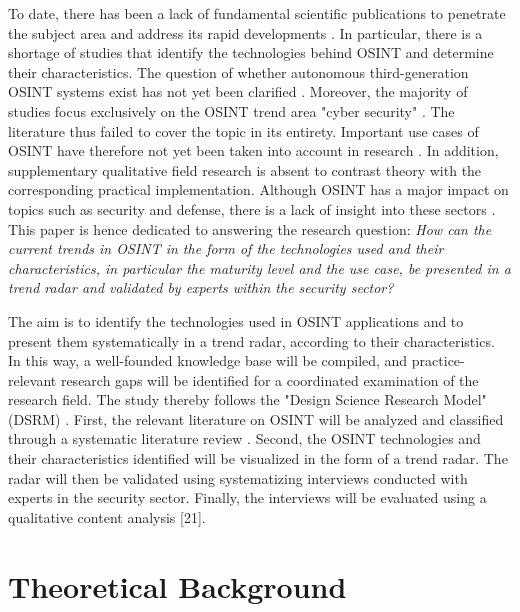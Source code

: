 \documentclass[10pt]{article}
\begin{document}
To date, there has been a lack of fundamental scientific publications to penetrate
the subject area \cite{HerreraCubides.2020} and address its rapid
developments \cite{Ghioni.2023, Williams.2018}. In particular, there is a shortage of
studies that identify the technologies behind OSINT and determine their characteristics.
The question of whether autonomous third-generation OSINT systems \cite{PastorGalindo.2019, PastorGalindo.2020} exist
has not yet been clarified \cite{Ghioni.2023, PastorGalindo.2020,Yogish.2021}.
Moreover, the majority of studies focus exclusively on the OSINT trend area "cyber
security" \cite{Hwang.2022, PastorGalindo.2019, Yogish.2021}. The literature thus failed to
cover the topic in its entirety. Important use cases of OSINT have
therefore not yet been taken into account in research \cite{AlKilani.2021, Dokman.2020, Ghioni.2023}.
In addition, supplementary qualitative field research is absent to contrast theory with
the corresponding practical implementation. Although OSINT has a major impact on topics
such as security and defense, there is a lack of insight into these sectors \cite{HerreraCubides.2020, PastorGalindo.2019}.
This paper is hence dedicated to answering the research question:
\textit{How can the current trends in OSINT in the form of the technologies used and their
    characteristics, in particular the maturity level and the use case, be presented in a
    trend radar and validated by experts within the security sector?}

The aim is to identify the technologies used in OSINT applications and to present
them systematically in a trend radar, according to their characteristics. In this way, a well-founded knowledge base will
be compiled, and practice-relevant research gaps will be identified for a coordinated examination
of the research field. The study thereby follows the "Design Science Research Model" (DSRM)
\cite{Peffers.2007}.  First, the relevant literature on OSINT will be analyzed and classified
through a systematic literature review \cite{Webster.2002}. Second, the OSINT technologies and
their characteristics identified will be visualized in the form of a trend radar. The radar
will then be validated using systematizing interviews \cite{Bogner.2014} conducted with
experts in the security sector. Finally, the interviews will be evaluated using a
qualitative content analysis [21].

\section{Theoretical Background}
\end{document}
